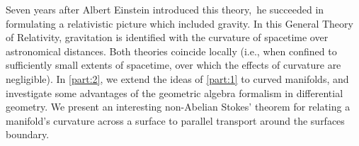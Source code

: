 Seven years after Albert Einstein introduced this theory,\sidenotemark\ he succeeded in formulating a relativistic picture which included gravity.
In this General Theory of Relativity, gravitation is identified with the curvature of spacetime over astronomical distances.
Both theories coincide locally (i.e., when confined to sufficiently small extents of spacetime, over which the effects of curvature are negligible).
In \cref{part:2}, we extend the ideas of \cref{part:1} to curved manifolds, and investigate some advantages of the geometric algebra formalism in differential geometry.
We present an interesting non-Abelian Stokes' theorem for relating a manifold's curvature across a surface to parallel transport around the surfaces boundary.